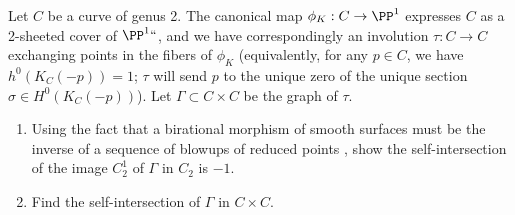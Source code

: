 \begin{exercise}\label{blowup of $J(C)$ at a point}
Let $C$ be a curve of genus 2. The canonical map $\phi_K : C \to
\PP^1$ expresses $C$ as a 
%
2-sheeted cover
 of $\PP^1` `$, and we have
correspondingly an involution $\tau : C \to C$ exchanging points in
the fibers of $\phi_K$ (equivalently, for any $p \in C$, we have
$h^0(K_C(-p)) = 1$; $\tau$ will send $p$ to the unique zero of the
unique section $\sigma \in H^0(K_C(-p))$). Let $\Gamma \subset C
\times C$ be the graph of $\tau$.
\begin{enumerate}
\item Using the fact that a birational morphism of smooth surfaces
%
  must be the inverse of a sequence of blowups of reduced points
  \cite[Chapter V, Theorem 5.5]{Hartshorne1977}, 
show the self-intersection of the
  image $C^1_2$ of $\Gamma$ in $C_2$ is $-1$.
\item Find the 
self-intersection 
%
of $\Gamma$ in $C \times C$.
\end{enumerate}
\end{exercise}




